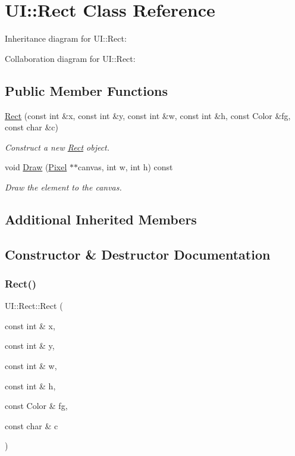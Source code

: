\hypertarget{classUI_1_1Rect}{}\section{UI\+:\+:Rect Class Reference}
\label{classUI_1_1Rect}


Inheritance diagram for UI\+:\+:Rect\+:


Collaboration diagram for UI\+:\+:Rect\+:
\subsection*{Public Member Functions}
\begin{DoxyCompactItemize}
\item 
\hyperlink{classUI_1_1Rect_a99b3b6ec65dc3825ca65e279180ecf28}{Rect} (const int \&x, const int \&y, const int \&w, const int \&h, const Color \&fg, const char \&c)
\begin{DoxyCompactList}\small\item\em Construct a new \hyperlink{classUI_1_1Rect}{Rect} object. \end{DoxyCompactList}\item 
void \hyperlink{classUI_1_1Rect_af66588786d683f88893411314ce3ca22}{Draw} (\hyperlink{classUI_1_1Pixel}{Pixel} $\ast$$\ast$canvas, int w, int h) const
\begin{DoxyCompactList}\small\item\em Draw the element to the canvas. \end{DoxyCompactList}\end{DoxyCompactItemize}
\subsection*{Additional Inherited Members}


\subsection{Constructor \& Destructor Documentation}
\mbox{\label{classUI_1_1Rect_a99b3b6ec65dc3825ca65e279180ecf28}} 
\subsubsection{\texorpdfstring{Rect()}{Rect()}}
{\footnotesize\ttfamily U\+I\+::\+Rect\+::\+Rect (\begin{DoxyParamCaption}\item[{const int \&}]{x,  }\item[{const int \&}]{y,  }\item[{const int \&}]{w,  }\item[{const int \&}]{h,  }\item[{const Color \&}]{fg,  }\item[{const char \&}]{c }\end{DoxyParamCaption})}



